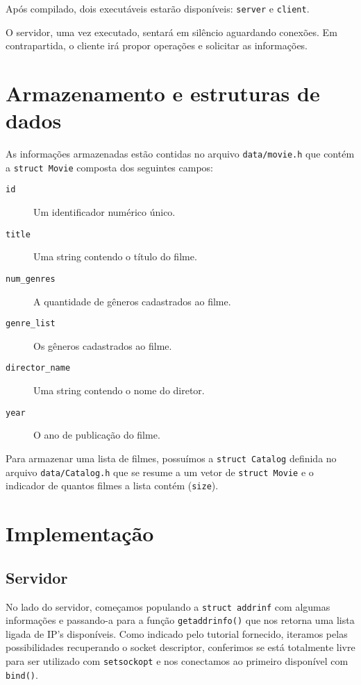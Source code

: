 \documentclass[11pt]{article}
\theoremstyle{definition}
\theoremstyle{definition}
\theoremstyle{remark}
\theoremstyle{remark}
\theoremstyle{remark}
\theoremstyle{remark}
\theoremstyle{definition}
\begin{document}
Após compilado, dois executáveis estarão disponíveis: \texttt{server} e \texttt{client}.

O servidor, uma vez executado, sentará em silêncio aguardando conexões. Em contrapartida, o cliente irá propor operações e solicitar as informações.

\section*{Armazenamento e estruturas de dados}
\label{sec:orgd5f146a}
As informações armazenadas estão contidas no arquivo \texttt{data/movie.h} que contém a \texttt{struct Movie} composta dos seguintes campos:
\begin{description}
\item[{\texttt{id}}] Um identificador numérico único.
\item[{\texttt{title}}] Uma string contendo o título do filme.
\item[{\texttt{num\_genres}}] A quantidade de gêneros cadastrados ao filme.
\item[{\texttt{genre\_list}}] Os gêneros cadastrados ao filme.
\item[{\texttt{director\_name}}] Uma string contendo o nome do diretor.
\item[{\texttt{year}}] O ano de publicação do filme.
\end{description}

Para armazenar uma lista de filmes, possuímos a \texttt{struct Catalog} definida no arquivo \texttt{data/Catalog.h} que se resume a um vetor de \texttt{struct Movie} e o indicador de quantos filmes a lista contém (\texttt{size}).

\section*{Implementação}
\label{sec:org2a89bd0}
\subsection*{Servidor}
\label{sec:org782b6d1}
No lado do servidor, começamos populando a \texttt{struct addrinf} com algumas informações e passando-a para a função \texttt{getaddrinfo()} que nos retorna uma lista ligada de IP's disponíveis. Como indicado pelo tutorial fornecido, iteramos pelas possibilidades recuperando o socket descriptor, conferimos se está totalmente livre para ser utilizado com \texttt{setsockopt} e nos conectamos ao primeiro disponível com \texttt{bind()}.
\end{document}
